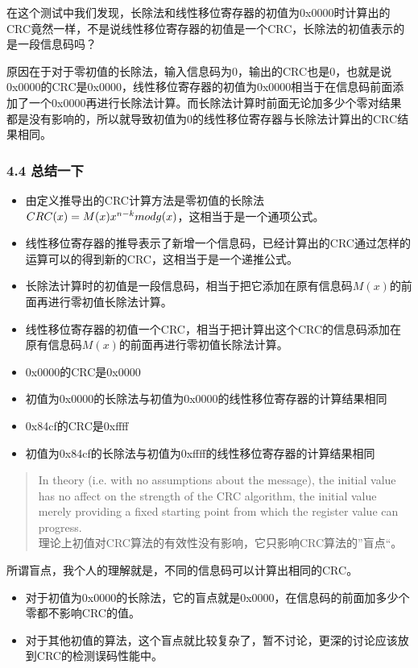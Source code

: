 \documentclass[
]{article}
\begin{document}
在这个测试中我们发现，长除法和线性移位寄存器的初值为0x0000时计算出的CRC竟然一样，不是说线性移位寄存器的初值是一个CRC，长除法的初值表示的是一段信息码吗？

原因在于对于零初值的长除法，输入信息码为0，输出的CRC也是0，也就是说0x0000的CRC是0x0000，线性移位寄存器的初值为0x0000相当于在信息码前面添加了一个0x0000再进行长除法计算。而长除法计算时前面无论加多少个零对结果都是没有影响的，所以就导致初值为0的线性移位寄存器与长除法计算出的CRC结果相同。

\hypertarget{header-n247}{%
\subsubsection{4.4 总结一下}\label{header-n247}}

\begin{itemize}
\item
  由定义推导出的CRC计算方法是零初值的长除法$CRC(x)=M(x)x^{n-k} \space mod \space g(x)$，这相当于是一个通项公式。
\item
  线性移位寄存器的推导表示了新增一个信息码，已经计算出的CRC通过怎样的运算可以的得到新的CRC，这相当于是一个递推公式。
\item
  长除法计算时的初值是一段信息码，相当于把它添加在原有信息码$M(x)$的前面再进行零初值长除法计算。
\item
  线性移位寄存器的初值一个CRC，相当于把计算出这个CRC的信息码添加在原有信息码$M(x)$的前面再进行零初值长除法计算。
\item
  0x0000的CRC是0x0000
\item
  初值为0x0000的长除法与初值为0x0000的线性移位寄存器的计算结果相同
\item
  0x84cf的CRC是0xffff
\item
  初值为0x84cf的长除法与初值为0xffff的线性移位寄存器的计算结果相同
\end{itemize}

\begin{quote}
In theory (i.e. with no assumptions about the message), the initial
value has no affect on the strength of the CRC algorithm, the initial
value merely providing a fixed starting point from which the register
value can progress. \\
理论上初值对CRC算法的有效性没有影响，它只影响CRC算法的''盲点``。
\end{quote}

所谓盲点，我个人的理解就是，不同的信息码可以计算出相同的CRC。

\begin{itemize}
\item
  对于初值为0x0000的长除法，它的盲点就是0x0000，在信息码的前面加多少个零都不影响CRC的值。
\item
  对于其他初值的算法，这个盲点就比较复杂了，暂不讨论，更深的讨论应该放到CRC的检测误码性能中。
\end{itemize}
\end{document}

